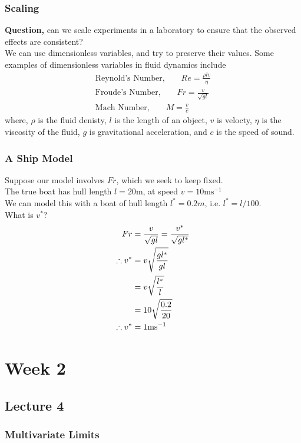 \documentclass{report}
\begin{document}
\subsection*{Scaling}
\textbf{Question,} can we scale experiments in a laboratory to ensure that the observed effects are consistent?\\
We can use dimensionless variables, and try to preserve their values. Some examples of dimensionless variables in fluid dynamics include
\begin{gather*}
	\text{Reynold's Number,}\qquad Re = \frac{\rho lv}{\eta} \\
	\text{Froude's Number,}\qquad Fr = \frac{v}{\sqrt{gl}} \\
	\text{Mach Number,}\qquad M = \frac{v}{c}
\end{gather*}
where, $\rho$ is the fluid denisty, $l$ is the length of an object, $v$ is velocty, $\eta$ is the viscosity of the fluid, $g$ is gravitational acceleration, and $c$ is the speed of sound.

\subsection*{A Ship Model}
Suppose our model involves $Fr$, which we seek to keep fixed. \\
The true boat has hull length $l=20\text{m}$, at speed $v=10\text{ms}^{-1}$\\
We can model this with a boat of hull length $l^*=0.2m$, i.e. $l^*=l/100$. \\
What is $v^*$?
\begin{gather*}
	\begin{aligned}
		Fr &= \frac{v}{\sqrt{gl}} = \frac{v^*}{\sqrt{gl^*}} \\
		\therefore v^* &= v \sqrt{\frac{gl^*}{gl}} \\
			&= v \sqrt{\frac{l^*}{l}} \\
			&= 10 \sqrt{\frac{0.2}{20}} \\
		\therefore v^* &= 1 \text{ms}^{-1}
	\end{aligned}
\end{gather*}

\chapter{Week 2}
\section{Lecture 4}
\subsection*{Multivariate Limits}
\end{document}
